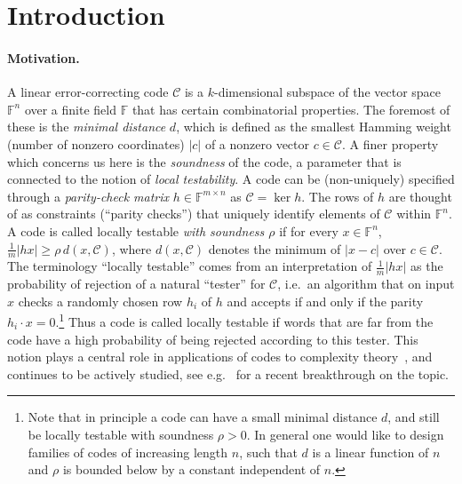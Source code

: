 \documentclass[11pt]{article}
\theoremstyle{definition}
\newcommand{\code}{\mathscr{C}}
\newcommand{\F}{\ensuremath{\mathbb{F}}}
\begin{document}
\section{Introduction}

\paragraph{Motivation.}
A linear error-correcting code $\code$ is a $k$-dimensional subspace of the vector space $\F^n$ over a finite field $\F$ that has certain combinatorial properties. The foremost of these is the \emph{minimal distance} $d$, which is defined as the smallest Hamming weight (number of nonzero coordinates) $|c|$ of a nonzero vector  $c\in\code$. A finer property which concerns us here is the \emph{soundness} of the code, a parameter that is connected to the notion of \emph{local testability}. A code can be (non-uniquely) specified through a \emph{parity-check matrix} $h\in\F^{m\times n}$ as $\code = \ker h$. The rows of $h$ are thought of as constraints (``parity checks'') that uniquely identify elements  of $\code$ within $\F^n$. A code is called locally testable \emph{with soundness $\rho$} if for every $x\in \F^n$, $\frac{1}{m}|hx|\geq \rho\, d(x,\code)$, where $d(x,\code)$ denotes the minimum of $|x-c|$ over $c\in \code$. The terminology ``locally testable'' comes from an interpretation of $\frac{1}{m}|hx|$ as the probability of rejection of a natural ``tester'' for $\code$, i.e.\ an algorithm that on input $x$ checks a randomly chosen row $h_i$ of $h$ and accepts if and only if the parity $h_i\cdot x=0$.\footnote{Note that in principle a code can have a small minimal distance $d$, and still be locally testable with soundness $\rho>0$. In general one would like to design families of codes of increasing length $n$, such that $d$ is a linear function of $n$ and $\rho$ is bounded below by a constant independent of $n$.}  Thus a code is called locally testable if words that are far from the code have a high probability of being rejected according to this tester. This notion plays a central role in applications of codes to complexity theory~\cite{babai1991non,PCP_thm}, and continues to be actively studied, see e.g.~\cite{LTC_DELLM,LTC_Panteleev_Kalachev} for a recent breakthrough on the topic. 
\end{document}

